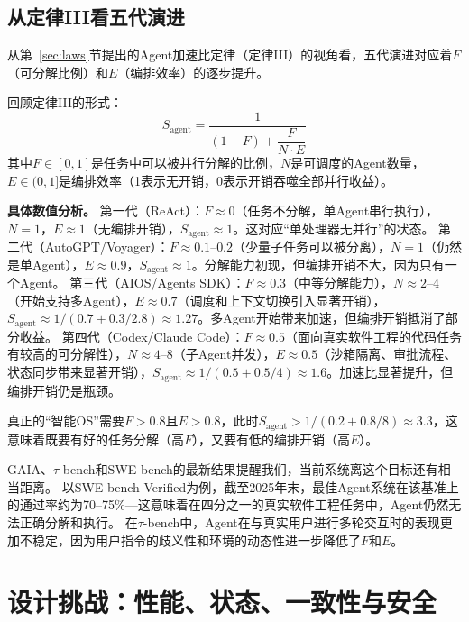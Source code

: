 \subsection*{从定律III看五代演进}

从第~\ref{sec:laws}节提出的Agent加速比定律（定律III）的视角看，五代演进对应着$F$（可分解比例）和$E$（编排效率）的逐步提升。

回顾定律III的形式：
\begin{equation}
\label{eq:agent_law_review}
S_{\mathrm{agent}} = \frac{1}{(1-F) + \dfrac{F}{N \cdot E}}
\end{equation}
其中$F \in [0,1]$是任务中可以被并行分解的比例，$N$是可调度的Agent数量，$E \in (0,1]$是编排效率（1表示无开销，0表示开销吞噬全部并行收益）。

\textbf{具体数值分析。}
第一代（ReAct）：$F \approx 0$（任务不分解，单Agent串行执行），$N=1$，$E \approx 1$（无编排开销），$S_{\mathrm{agent}} \approx 1$。这对应``单处理器无并行''的状态。
第二代（AutoGPT/Voyager）：$F \approx 0.1$--$0.2$（少量子任务可以被分离），$N=1$（仍然是单Agent），$E \approx 0.9$，$S_{\mathrm{agent}} \approx 1$。分解能力初现，但编排开销不大，因为只有一个Agent。
第三代（AIOS/Agents SDK）：$F \approx 0.3$（中等分解能力），$N \approx 2$--$4$（开始支持多Agent），$E \approx 0.7$（调度和上下文切换引入显著开销），$S_{\mathrm{agent}} \approx 1/(0.7 + 0.3/2.8) \approx 1.27$。多Agent开始带来加速，但编排开销抵消了部分收益。
第四代（Codex/Claude Code）：$F \approx 0.5$（面向真实软件工程的代码任务有较高的可分解性），$N \approx 4$--$8$（子Agent并发），$E \approx 0.5$（沙箱隔离、审批流程、状态同步带来显著开销），$S_{\mathrm{agent}} \approx 1/(0.5 + 0.5/4) \approx 1.6$。加速比显著提升，但编排开销仍是瓶颈。

真正的``智能OS''需要$F > 0.8$且$E > 0.8$，此时$S_{\mathrm{agent}} > 1/(0.2 + 0.8/8) \approx 3.3$，这意味着既要有好的任务分解（高$F$），又要有低的编排开销（高$E$）。

GAIA\cite{gaia2023}、$\tau$-bench\cite{taubench2024}和SWE-bench\cite{swebench2023}的最新结果提醒我们，当前系统离这个目标还有相当距离。
以SWE-bench Verified为例，截至2025年末，最佳Agent系统在该基准上的通过率约为70--75\%---这意味着在四分之一的真实软件工程任务中，Agent仍然无法正确分解和执行。
在$\tau$-bench中，Agent在与真实用户进行多轮交互时的表现更加不稳定，因为用户指令的歧义性和环境的动态性进一步降低了$F$和$E$。

\section{设计挑战：性能、状态、一致性与安全}
\label{sec:challenges}

